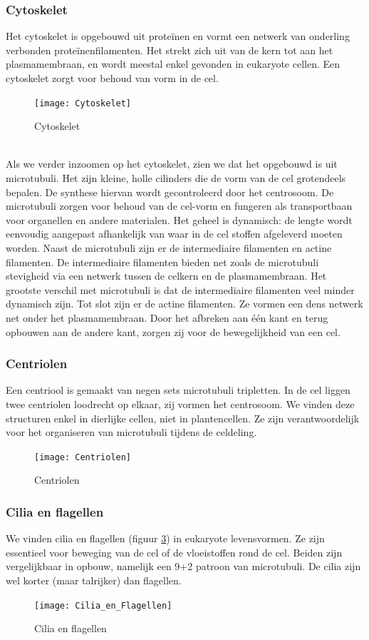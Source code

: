 \documentclass[a4paper,kul]{kulakarticle} %
\begin{document}
\subsubsection{Cytoskelet}
Het cytoskelet is opgebouwd uit proteïnen en vormt een netwerk van onderling verbonden proteïnenfilamenten. Het strekt zich uit van de kern tot aan het plasmamembraan, en wordt meestal enkel gevonden in eukaryote cellen. Een cytoskelet zorgt voor behoud van vorm in de cel.
\begin{figure}[h]
	\centering
	\texttt{[image: Cytoskelet]}
	\caption[Cytoskelet]{Cytoskelet}
	\label{fig:cytoskelet}
\end{figure}\\
Als we verder inzoomen op het cytoskelet, zien we dat het opgebouwd is uit microtubuli. Het zijn kleine, holle cilinders die de vorm van de cel grotendeels bepalen. De synthese hiervan wordt gecontroleerd door het centrosoom. De microtubuli zorgen voor behoud van de cel-vorm en fungeren als transportbaan voor organellen en andere materialen. Het geheel is dynamisch: de lengte wordt eenvoudig aangepast afhankelijk van waar in de cel stoffen afgeleverd moeten worden. 
Naast de microtubuli zijn er de intermediaire filamenten en actine filamenten. De intermediaire filamenten bieden net zoals de microtubuli stevigheid via een netwerk tussen de celkern en de plasmamembraan. Het grootste verschil met microtubuli is dat de intermediaire filamenten veel minder dynamisch zijn.
Tot slot zijn er de actine filamenten. Ze vormen een dens netwerk net onder het plasmamembraan. Door het afbreken aan één kant en terug opbouwen aan de andere kant, zorgen zij voor de bewegelijkheid van een cel.

\subsubsection{Centriolen}
Een centriool is gemaakt van negen sets microtubuli tripletten. In de cel liggen twee centriolen loodrecht op elkaar, zij vormen het centrosoom. We vinden deze structuren enkel in dierlijke cellen, niet in plantencellen. Ze zijn verantwoordelijk voor het organiseren van microtubuli tijdens de celdeling. 
\begin{figure}[h]
	\centering
	\texttt{[image: Centriolen]}
	\caption[Centriolen]{Centriolen}
	\label{fig:centriolen}
\end{figure}
\newpage
\subsubsection{Cilia en flagellen}
We vinden cilia en flagellen (figuur \ref{fig:ciliaenflagellen}) in eukaryote levensvormen. Ze zijn essentieel voor beweging van de cel of de vloeistoffen rond de cel. Beiden zijn vergelijkbaar in opbouw, namelijk een 9+2 patroon van microtubuli. De cilia zijn wel korter (maar talrijker) dan flagellen.
\begin{figure}[h]
	\centering
	\texttt{[image: Cilia\_en\_Flagellen]}
	\caption[Cilia en flagellen]{Cilia en flagellen}
	\label{fig:ciliaenflagellen}
\end{figure}
\end{document}
